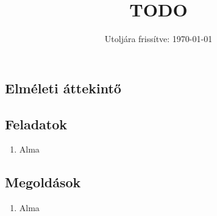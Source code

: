 \documentclass{szb-practice}
\title{TODO}
\date{Utoljára frissítve: \today}
\begin{document}
\maketitle

\subsection{Elméleti áttekintő}

\clearpage
\subsection{Feladatok}

\begin{enumerate}
  \item Alma
\end{enumerate}

\clearpage
\subsection{Megoldások}
\begin{enumerate}
  \item Alma
\end{enumerate}
\end{document}
